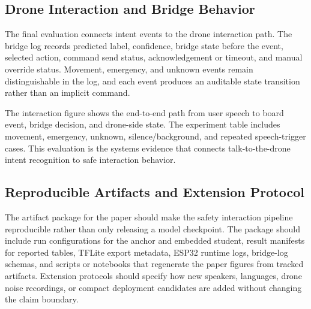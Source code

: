 \subsection{Drone Interaction and Bridge Behavior}

The final evaluation connects intent events to the drone interaction path. The bridge log records predicted label, confidence, bridge state before the event, selected action, command send status, acknowledgement or timeout, and manual override status. Movement, emergency, and unknown events remain distinguishable in the log, and each event produces an auditable state transition rather than an implicit command.

The interaction figure shows the end-to-end path from user speech to board event, bridge decision, and drone-side state. The experiment table includes movement, emergency, unknown, silence/background, and repeated speech-trigger cases. This evaluation is the systems evidence that connects talk-to-the-drone intent recognition to safe interaction behavior.

\subsection{Reproducible Artifacts and Extension Protocol}

The artifact package for the paper should make the safety interaction pipeline reproducible rather than only releasing a model checkpoint. The package should include run configurations for the anchor and embedded student, result manifests for reported tables, TFLite export metadata, ESP32 runtime logs, bridge-log schemas, and scripts or notebooks that regenerate the paper figures from tracked artifacts. Extension protocols should specify how new speakers, languages, drone noise recordings, or compact deployment candidates are added without changing the claim boundary.
